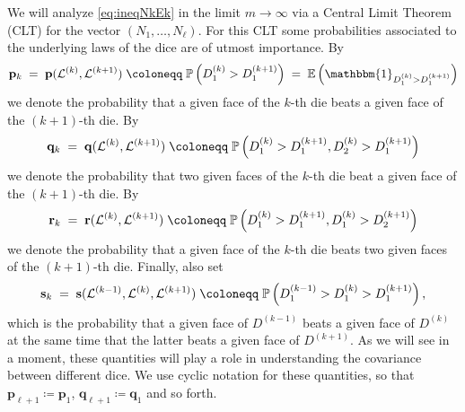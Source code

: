 \documentclass[reqno,a4paper,11pt]{amsart}
\theoremstyle{remark}
\newcommand{\mc}[1]{{\mathcal #1}}
\newcommand{\mb}[1]{{\mathbf #1}}
\newcommand{\bb}[1]{{\mathbb #1}}
\newcommand{\ind}{\mathbbm{1}}
\numberwithin{equation}{section}
\begin{document}
We will analyze \eqref{eq:ineqNkEk} in the limit $m\to \infty$ via a Central Limit Theorem (CLT) for the vector $(N_1, \ldots,
N_\ell)$. For this CLT some probabilities associated to the underlying laws of the dice are of utmost importance. By
\begin{equation}\label{eq:defpk}
{\bf p}_k\;=\;{\bf p}(\mc L^{(k)},\mc L^{(k+1)}) \;\coloneqq\; \bb P\left(D^{(k)}_1> D^{(k+1)}_1\right)\;=\;\bb E\left(\ind_{D_1^{(k)}>D_1^{(k+1)}}\right)
\end{equation}
we denote the probability that a given face of the $k$-th die beats a given
face of the  $(k+1)$-th die. By
\begin{equation}\label{eq:defqk}
{\bf q}_k\;=\;{\bf q}(\mc L^{(k)},\mc L^{(k+1)}) \;\coloneqq\; \bb P\left(D^{(k)}_1> D^{(k+1)}_1, D^{(k)}_2> D^{(k+1)}_1\right)
\end{equation}
%
we denote the probability that two given faces of the $k$-th die beat a given face of the  $(k+1)$-th die. By
\begin{equation}\label{eq:defrk}
{\bf r}_k\;=\;{\bf r}(\mc L^{(k)},\mc L^{(k+1)}) \;\coloneqq\; \bb P\left(D^{(k)}_1> D^{(k+1)}_1, D^{(k)}_1> D^{(k+1)}_2\right)
\end{equation}
we denote the probability that a given face of the $k$-th die beats two given faces of the  $(k+1)$-th die. Finally, also set
\begin{equation}\label{eq:defsk}
{\bf s}_k \;=\;{\bf s}(\mc L^{(k-1)},\mc L^{(k)},\mc L^{(k+1)})\;\coloneqq\; \bb P\left(D^{(k-1)}_1 > D^{(k)}_1 > D^{(k+1)}_1\right),
\end{equation}
%
which is the probability that a given face of $D^{(k-1)}$ beats a given face of $D^{(k)}$ at the same time that the latter beats a given face of $D^{(k+1)}$.  As we will see in a moment, these quantities will play a role in understanding the covariance between different dice. We use cyclic notation for these quantities, so that $\mb p_{\ell+1}\coloneqq \mb p_1$, $\mb q_{\ell+1}\coloneqq\mb q_1$ and so forth.
\end{document}
